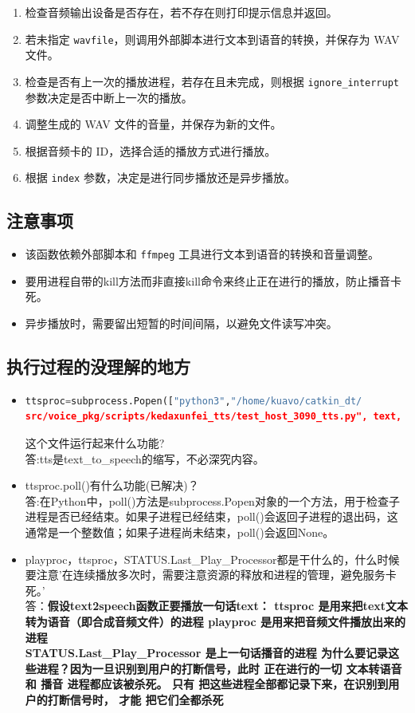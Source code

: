 \documentclass[]{article}
\begin{document}
	\begin{enumerate}
		\item 检查音频输出设备是否存在，若不存在则打印提示信息并返回。
		\item 若未指定 \texttt{wavfile}，则调用外部脚本进行文本到语音的转换，并保存为 WAV 文件。
		\item 检查是否有上一次的播放进程，若存在且未完成，则根据 \texttt{ignore\_interrupt} 参数决定是否中断上一次的播放。
		\item 调整生成的 WAV 文件的音量，并保存为新的文件。
		\item 根据音频卡的 ID，选择合适的播放方式进行播放。
		\item 根据 \texttt{index} 参数，决定是进行同步播放还是异步播放。
	\end{enumerate}
	
	\subsection{注意事项}
	
	\begin{itemize}
		\item 该函数依赖外部脚本和 \texttt{ffmpeg} 工具进行文本到语音的转换和音量调整。
		\item 要用进程自带的kill方法而非直接kill命令来终止正在进行的播放，防止播音卡死。
		\item 异步播放时，需要留出短暂的时间间隔，以避免文件读写冲突。
	\end{itemize}

\subsection{执行过程的没理解的地方}
\begin{itemize}
	\item 
	\begin{lstlisting}[language=Python]
ttsproc=subprocess.Popen(["python3","/home/kuavo/catkin_dt/
src/voice_pkg/scripts/kedaxunfei_tts/test_host_3090_tts.py", text, savepath])
\end{lstlisting}这个文件运行起来什么功能?\\答:tts是text\_to\_speech的缩写，不必深究内容。
	\item ttsproc.poll()有什么功能(已解决)？\\答:在Python中，poll()方法是subprocess.Popen对象的一个方法，用于检查子进程是否已经结束。如果子进程已经结束，poll()会返回子进程的退出码，这通常是一个整数值；如果子进程尚未结束，poll()会返回None。
	\item playproc，ttsproc，STATUS.Last\_Play\_Processor都是干什么的，什么时候要注意'在连续播放多次时，需要注意资源的释放和进程的管理，避免服务卡死。'\\答：\textbf{假设text2speech函数正要播放一句话text：
	ttsproc 是用来把text文本转为语音（即合成音频文件）的进程
	playproc 是用来把音频文件播放出来的进程\\
	STATUS.Last\_Play\_Processor 是上一句话播音的进程
	为什么要记录这些进程？因为一旦识别到用户的打断信号，此时
	正在进行的一切 文本转语音 和 播音 进程都应该被杀死。 只有
	把这些进程全部都记录下来，在识别到用户的打断信号时， 才能
	把它们全都杀死}
\end{itemize}	
\end{document}
